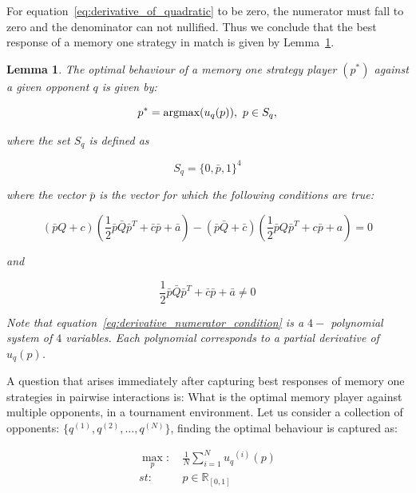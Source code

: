\documentclass[10pt]{article}
\newcommand{\R}{\mathbb{R}}
\newtheorem{lemma}[theorem]{Lemma}
\begin{document}
For equation~\ref{eq:derivative_of_quadratic} to be zero, the numerator must fall
to zero and the denominator can not nullified. Thus we conclude that the best
response of a memory one strategy in match is given by Lemma~\ref{lemma:memone_best_response}.

\begin{lemma}\label{lemma:memone_best_response}
    The optimal behaviour of a memory one strategy player \((p^*)\) against a
    given opponent \(q\) is given by:
    
    \[p^* = \textnormal{argmax}(u_q(p)), \ p \in S_q,\]
    
    where the set \(S_q\) is defined as 
    
    \[S_q = \{0, \bar{p}, 1 \}^4 \]
    
    where the vector \(\bar{p}\) is the vector for which the following conditions
    are true:
    
    {\small
    \begin{equation}\label{eq:derivative_numerator_condition}
        (\bar{p}Q + c) ( \frac{1}{2} \bar{p}  \bar{Q}  \bar{p}^T + \bar{c}  \bar{p} + \bar{a}) 
        - (\bar{p}\bar{Q} + \bar{c})( \frac{1}{2} \bar{p}  Q  \bar{p}^T + c \bar{p} + a) = 0
    \end{equation}}

    and

    {\small
    \begin{equation}
        \frac{1}{2} \bar{p}  \bar{Q}  \bar{p}^T + \bar{c}  \bar{p} + \bar{a} \neq 0
    \end{equation}}

    Note that equation~\ref{eq:derivative_numerator_condition}  is a \(4-\)
    polynomial system of \(4\) variables. Each polynomial corresponds to a partial
    derivative of \(u_q(p)\).
\end{lemma}

A question that arises immediately after capturing best responses of memory one
strategies in pairwise interactions is: What is the optimal memory player against
multiple opponents, in a tournament environment. Let us consider a collection of
opponents: \(\{q^{(1)}, q^{(2)}, \dots, q^{(N)}\}\),  finding the optimal behaviour
is captured as:

\begin{equation}\label{eq:mo_tournament_optimisation}
\begin{aligned}
\max_p: & \ \frac{1}{N} \sum_{i=1} ^ {N} {u_q}^{(i)} (p) 
\\
st: & \ p \in \R_{[0, 1]} 
\end{aligned}
\end{equation}
\end{document}
